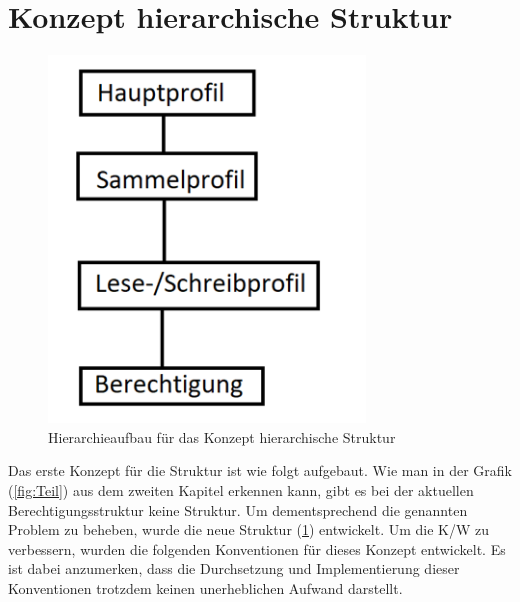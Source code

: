 \section{Konzept hierarchische Struktur}
\label{sec:chapter04:Struktur}
\begin{figure}[h!]
 \centering
 \includegraphics[width=0.75\textwidth]{gfx/Picture/Hierarchie.PNG}
 \caption{Hierarchieaufbau für das Konzept hierarchische Struktur}
 \label{fig:Struktur}
\end{figure}
Das erste Konzept für die Struktur ist wie folgt aufgebaut.
Wie man in der Grafik (\ref{fig:Teil}) aus dem zweiten Kapitel erkennen kann, gibt es bei der aktuellen Berechtigungsstruktur keine Struktur.
Um dementsprechend die genannten Problem zu beheben, wurde die neue Struktur (\ref{fig:Struktur}) entwickelt.
Um die \ac{K/W} zu verbessern, wurden die folgenden Konventionen für dieses Konzept entwickelt.
Es ist dabei anzumerken, dass die Durchsetzung und Implementierung dieser Konventionen trotzdem keinen unerheblichen Aufwand darstellt.
